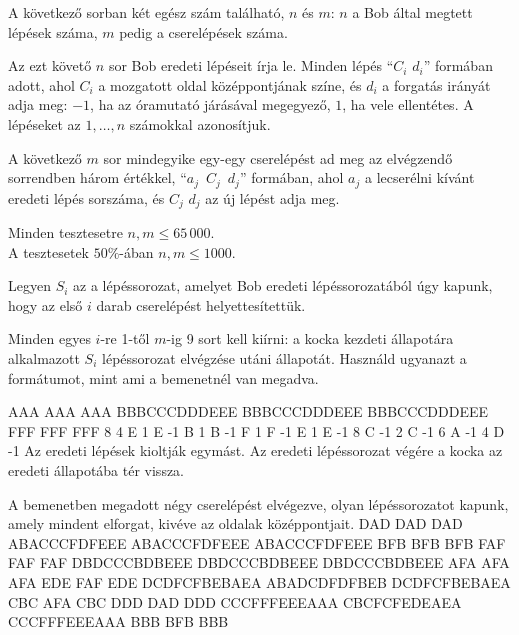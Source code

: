 A következő sorban két egész szám található, $n$ és $m$: $n$ a Bob által megtett lépések száma, $m$ pedig a cserelépések száma.

Az ezt követő $n$ sor Bob eredeti lépéseit írja le. Minden lépés ``$C_i$ $d_i$'' formában adott, ahol $C_i$ a mozgatott oldal középpontjának színe, és $d_i$ a forgatás irányát adja meg: $-1$, ha az óramutató járásával megegyező, $1$, ha vele ellentétes. A lépéseket az $1, \ldots, n$ számokkal azonosítjuk.

A következő $m$ sor mindegyike egy-egy cserelépést ad meg az elvégzendő sorrendben három értékkel, \mbox{``$a_j$ $C_j$ $d_j$''} formában, ahol $a_j$ a lecserélni kívánt eredeti lépés sorszáma, és $C_j$ $d_j$ az új lépést adja meg.


\noindent Minden tesztesetre $n,m \leq 65\,000$.\\
A tesztesetek $50\%$-ában $n,m \leq 1000$.


Legyen $S_i$ az a lépéssorozat, amelyet Bob eredeti lépéssorozatából úgy kapunk, hogy az első $i$ darab cserelépést helyettesítettük.

Minden egyes $i$-re 1-től $m$-ig 9 sort kell kiírni: a kocka kezdeti állapotára alkalmazott $S_i$ lépéssorozat elvégzése utáni állapotát. Használd ugyanazt a formátumot, mint ami a bemenetnél van megadva.


\sampleIN
AAA
AAA
AAA
BBBCCCDDDEEE
BBBCCCDDDEEE
BBBCCCDDDEEE
FFF
FFF
FFF
8 4
E 1
E -1
B 1
B -1
F 1
F -1
E 1
E -1
8 C -1
2 C -1
6 A -1
4 D -1
\sampleCOMMENT
Az eredeti lépések kioltják egymást. Az eredeti lépéssorozat végére a kocka az eredeti állapotába tér vissza.

A bemenetben megadott négy cserelépést elvégezve, olyan lépéssorozatot kapunk, amely mindent elforgat, kivéve az oldalak középpontjait.
\sampleOUT
DAD
DAD
DAD
ABACCCFDFEEE
ABACCCFDFEEE
ABACCCFDFEEE
BFB
BFB
BFB
FAF
FAF
FAF
DBDCCCBDBEEE
DBDCCCBDBEEE
DBDCCCBDBEEE
AFA
AFA
AFA
EDE
FAF
EDE
DCDFCFBEBAEA
ABADCDFDFBEB
DCDFCFBEBAEA
CBC
AFA
CBC
DDD
DAD
DDD
CCCFFFEEEAAA
CBCFCFEDEAEA
CCCFFFEEEAAA
BBB
BFB
BBB
\sampleEND



